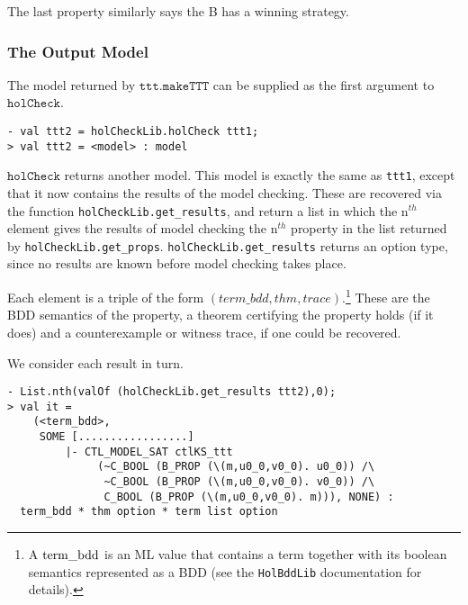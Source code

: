 \documentclass[12pt,fleqn]{article}
\begin{document}
The last property similarly says the B has a winning strategy.

\subsubsection{The Output Model}

The model returned by \(\mathtt{ttt.makeTTT}\) can be supplied as the first argument to \(\mathtt{holCheck}\).

\begin{session}\begin{verbatim}
- val ttt2 = holCheckLib.holCheck ttt1;
> val ttt2 = <model> : model
\end{verbatim}\end{session}

\(\mathtt{holCheck}\) returns another model. This model is exactly the same as \texttt{ttt1}, except that it now contains the results of the model checking. These are recovered via the function \texttt{holCheckLib.get\_results}, and return a list in which the n\({}^{th}\) element gives the results of model checking the n\({}^{th}\) property in the list returned by \texttt{holCheckLib.get\_props}. \texttt{holCheckLib.get\_results} returns an option type, since no results are known before model checking takes place.

Each element is a triple of the form \( (term\_bdd,thm,trace) \).\footnote{A \(\textup{term\_bdd}\) is an ML value that contains a \HOL{} term together with its boolean semantics represented as a BDD (see the \texttt{HolBddLib} documentation for details).} These are the BDD semantics of the property, a theorem certifying the property holds (if it does) and a counterexample or witness trace, if one could be recovered.

We consider each result in turn.

\begin{session}\begin{verbatim}
- List.nth(valOf (holCheckLib.get_results ttt2),0);
> val it =
    (<term_bdd>,
     SOME [.................]
         |- CTL_MODEL_SAT ctlKS_ttt
              (~C_BOOL (B_PROP (\(m,u0_0,v0_0). u0_0)) /\
               ~C_BOOL (B_PROP (\(m,u0_0,v0_0). v0_0)) /\
               C_BOOL (B_PROP (\(m,u0_0,v0_0). m))), NONE) :
  term_bdd * thm option * term list option
\end{verbatim}\end{session}
\end{document}
